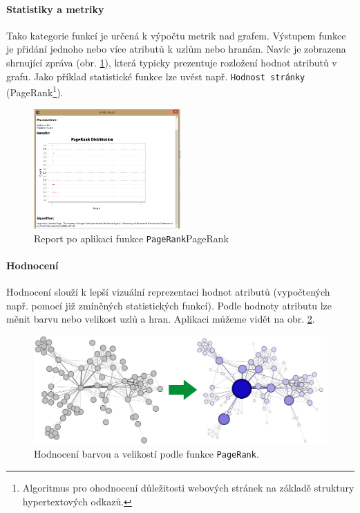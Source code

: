 \documentclass[thesis=M,czech]{FITthesis}[2014/05/6]
\begin{document}
\paragraph{Statistiky a metriky}
Tako kategorie funkcí je určená k výpočtu metrik nad grafem. Výstupem funkce je přidání jednoho nebo více atributů k uzlům nebo hranám. Navíc je zobrazena
shrnující zpráva (obr. \ref{fig:gephi-pagerank}), která typicky prezentuje rozložení hodnot atributů v grafu. Jako příklad statistické funkce lze uvést např. \texttt{Hodnost stránky} (PageRank\footnote{Algoritmus
pro ohodnocení důležitosti webových stránek na základě struktury hypertextových odkazů.}).

\begin{figure}\centering
 	\includegraphics[width=0.5\textwidth]{images/gephi/statistics-pagerank}
 	\caption[Report po aplikaci funkce \texttt{PageRank}]{Report po aplikaci funkce \texttt{PageRank}PageRank}\label{fig:gephi-pagerank}
\end{figure}

\paragraph{Hodnocení}
Hodnocení slouží k lepší vizuální reprezentaci hodnot atributů (vypočtených např. pomocí již zmíněných statistických funkcí). Podle hodnoty atributu lze 
měnit barvu nebo velikost uzlů a hran. Aplikaci  můžeme vidět na obr. \ref{fig:gephi-ranking}.

\begin{figure}\centering
 	\includegraphics[width=1\textwidth]{images/gephi/ranking_before-after}
 	\caption[Hodnocení barvou a velikostí podle funkce \texttt{PageRank}]{Hodnocení barvou a velikostí podle funkce \texttt{PageRank}.}\label{fig:gephi-ranking}
\end{figure}
\end{document}
